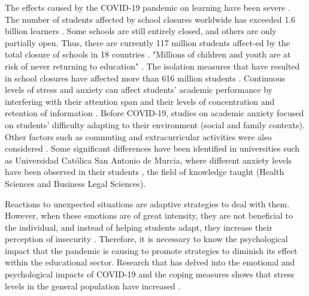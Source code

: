\documentclass[english]{textolivre}
\begin{document}
The effects caused by the COVID-19 pandemic on learning have been severe \cite{unicef_state_2021}. The number of students affected by school closures worldwide has exceeded 1.6 billion learners \cite{unicef_state_2021}. Some schools are still entirely closed, and others are only partially open. Thus, there are currently 117 million students affect-ed by the total closure of schools in 18 countries \cite{unesco_unesco_2021}. "Millions of children and youth are at risk of never returning to education" \cite[p.~5]{unicef_state_2021}. The isolation measures that have resulted in school closures have affected more than 616 million students \cite{unicef_covid:19_2022}. Continuous levels of stress and anxiety can affect students' academic performance \cite{fernandez_cruz_evaluation_2020,sanchez-gomez_inteligencia_2020,morales_rodriguez_diferencias_2021} by interfering with their attention span and their levels of concentration and retention of information \cite{jadue_algunos_2001}. Before COVID-19, studies on academic anxiety focused on students' difficulty adapting to their environment (social and family contexts). Other factors such as commuting and extracurricular activities were also considered \cite{balanza_galindo_prevalencia_2009}. Some significant differences have been identified in universities such as Universidad Católica San Antonio de Murcia, where different anxiety levels have been observed in their students \cite{balanza_galindo_prevalencia_2009}, the field of knowledge taught (Health Sciences and Business Legal Sciences).

Reactions to unexpected situations are adaptive strategies to deal with them. However, when these emotions are of great intensity, they are not beneficial to the individual, and instead of helping students adapt, they increase their perception of insecurity \cite{valero_cedeno_afrontamiento_2020}. Therefore, it is necessary to know the psychological impact that the pandemic is causing to promote strategies to diminish its effect within the educational sector. Research that has delved into the emotional and psychological impacts of COVID-19 and the coping measures shows that stress levels in the general population have increased \cite{barraza_macias_estres_2020,valiente_vida-covid-19_2020}.
\end{document}

